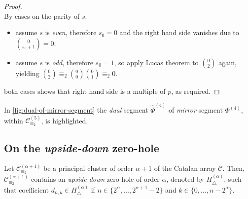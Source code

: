 \begin{proof}
\begin{displaymath}
    \end{displaymath}
    By cases on the parity of $s$:
    \begin{itemize}
        \item assume $s$ is \emph{even}, therefore $s_{0}=0$ and the right hand side vanishes due to ${{0}\choose{s_{0}+1}}=0$;
        \item assume $s$ is \emph{odd}, therefore $s_{0}=1$, so apply Lucas theorem to ${{0}\choose{2}}$ again,
            yielding ${{0}\choose{2}}\equiv_{2}{{0}\choose{0}}{{0}\choose{1}}\equiv_{2}0$.
    \end{itemize}
    both cases shows that right hand side is a multiple of $p$, as required.
\end{proof}


In \autoref{fig:dual-of-mirror-segment} the \emph{dual} segment $\hat{\Phi}^{(4)}$
    of \emph{mirror} segment $\Phi^{(4)}$, within $\mathcal{C}_{\equiv_{2}}^{(5)}$, is highlighted.

\subsection{On the \emph{upside-down} zero-hole}

\begin{theorem}
    Let $\mathcal{C}_{\equiv_{2}}^{(\alpha+1)}$ be a principal cluster
    of order $\alpha+1$ of the Catalan array $\mathcal{C}$. Then, $\mathcal{C}_{\equiv_{2}}^{(\alpha+1)}$
    contains an \emph{upside-down} zero-hole of order $\alpha$, denoted by $H_{\bigtriangleup}^{({\alpha})}$,
    such that coefficient $d_{n,k}\in H_{\bigtriangleup}^{({\alpha})}$ if
    $n\in\lbrace 2^{{\alpha}},\ldots,2^{{\alpha}+1}-2\rbrace$ and
    $k\in\lbrace 0,\ldots, n-2^{{\alpha}}\rbrace$.
    \label{thm:upside:down:zero:hole}
\end{theorem}


